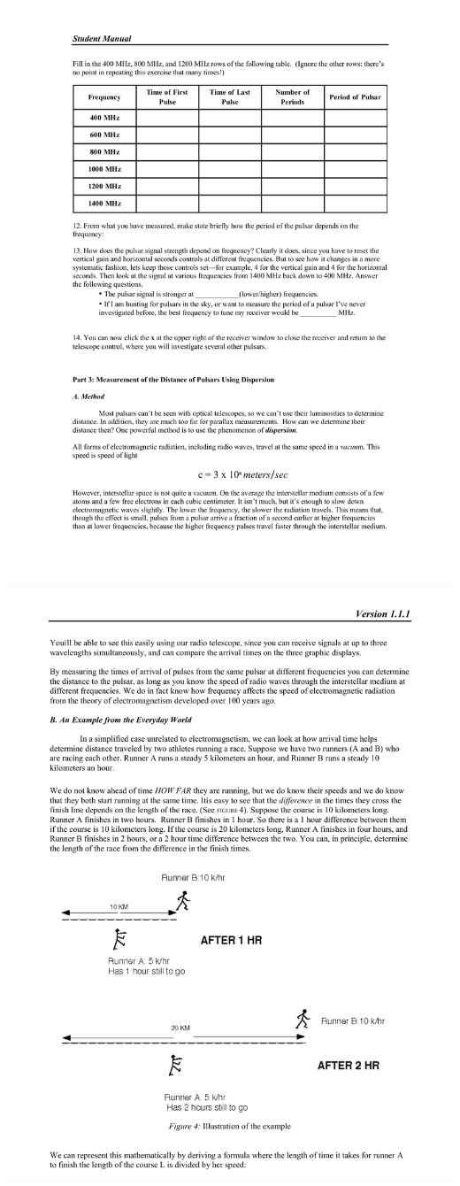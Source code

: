\includegraphics[width=\textwidth]{pulsars/pulsar6.pdf}
\vfil\eject

\includegraphics[width=\textwidth]{pulsars/pulsar7.pdf}
\vfil\eject

